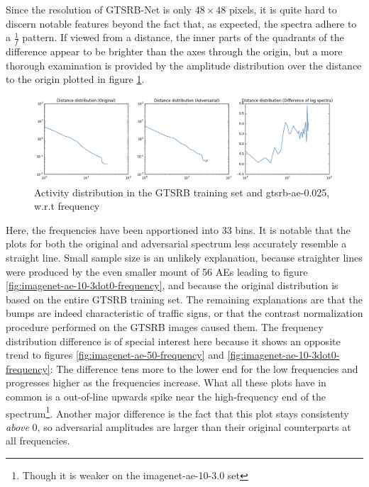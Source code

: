 \documentclass[11pt, a4paper]{article}
\begin{document}
Since the resolution of GTSRB-Net is only $48 \times 48$ pixels, it is quite hard to discern notable features beyond the fact that, as expected, the spectra adhere to a $\frac{1}{f}$ pattern. If viewed from a distance, the inner parts of the quadrants of the difference appear to be brighter than the axes through the origin, but a more thorough examination is provided by the amplitude distribution over the distance to the origin plotted in figure \ref{fig:gtsrb-ae-0dot025-frequency}.

\begin{figure}[htb]
	\centering
	\includegraphics[width=\textwidth]{images/spectra/gtsrb-ae-0dot025-minconfidence-0dot5-maxorig-0-distance-33-bins.png}
	\caption{Activity distribution in the GTSRB training set and gtsrb-ae-0.025, w.r.t frequency}
	\label{fig:gtsrb-ae-0dot025-frequency}
\end{figure}

Here, the frequencies have been apportioned into 33 bins. It is notable that the plots for both the original and adversarial spectrum less accurately resemble a straight line. Small sample size is an unlikely explanation, because straighter lines were produced by the even smaller mount of 56 AEs leading to figure \ref{fig:imagenet-ae-10-3dot0-frequency}, and because the original distribution is based on the entire GTSRB training set. The remaining explanations are that the bumps are indeed characteristic of traffic signs, or that the contrast normalization procedure performed on the GTSRB images caused them. The frequency distribution difference is of special interest here because it shows an opposite trend to figures \ref{fig:imagenet-ae-50-frequency} and \ref{fig:imagenet-ae-10-3dot0-frequency}: The difference tens more to the lower end for the low frequencies and progresses higher as the frequencies increase. What all these plots have in common is a out-of-line upwards spike near the high-frequency end of the spectrum\footnote{Though it is weaker on the imagenet-ae-10-3.0 set}. Another major difference is the fact that this plot stays consistenty \emph{above} 0, so adversarial amplitudes are larger than their original counterparts at all frequencies.
\end{document}
